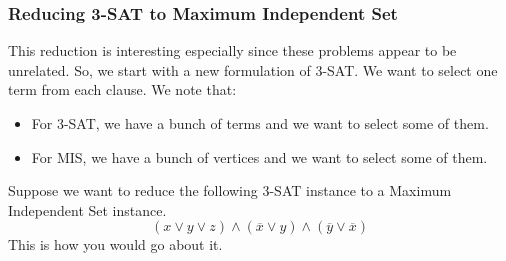 \documentclass[letterpaper]{article}
\begin{document}
\subsubsection{Reducing 3-SAT to Maximum Independent Set}
This reduction is interesting especially since these problems appear to be unrelated. So, we start with a new formulation of 3-SAT. We want to select one term from each clause. We note that: 
\begin{itemize}
    \item For 3-SAT, we have a bunch of terms and we want to select some of them. 
    \item For MIS, we have a bunch of vertices and we want to select some of them. 
\end{itemize}
Suppose we want to reduce the following 3-SAT instance to a Maximum Independent Set instance.
\[(x \lor y \lor z) \land (\overline{x} \lor y) \land (\overline{y} \lor \overline{x})\]
This is how you would go about it. 
\end{document}

